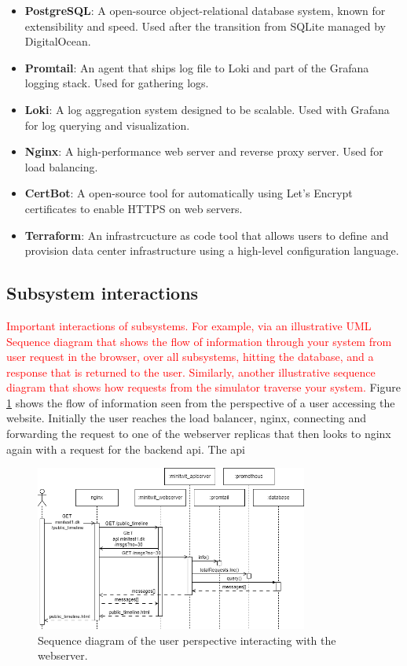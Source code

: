 \begin{multicols}{2}
\begin{itemize}
        \item \textbf{PostgreSQL}: A open-source object-relational database system, known for extensibility and speed. Used after the transition from SQLite managed by DigitalOcean.
        \item \textbf{Promtail}: An agent that ships log file to Loki and part of the Grafana logging stack. Used for gathering logs.
        \item \textbf{Loki}: A log aggregation system designed to be scalable. Used with Grafana for log querying and visualization.
        \item \textbf{Nginx}: A high-performance web server and reverse proxy server. Used for load balancing.
        \item \textbf{CertBot}: A open-source tool for automatically using Let's Encrypt certificates to enable HTTPS on web servers.
        \item \textbf{Terraform}: An infrastrcucture as code tool that allows users to define and provision data center infrastructure using a high-level configuration language. %
    \end{itemize}
\end{multicols}



\subsection{Subsystem interactions}
\textcolor{red}{Important interactions of subsystems.
For example, via an illustrative UML Sequence diagram that shows the flow of information through your system from user request in the browser, over all subsystems, hitting the database, and a response that is returned to the user.
Similarly, another illustrative sequence diagram that shows how requests from the simulator traverse your system.}
Figure \ref{fig:user_sequence} shows the flow of information seen from the perspective of a user accessing the website. Initially the user reaches the load balancer, nginx, connecting and forwarding the request to one of the webserver replicas that then looks to nginx again with a request for the backend api. The api 
\begin{figure}[H]
    \centering
    \includegraphics[width=0.8\textwidth]{images/sequence.png}
    \caption{Sequence diagram of the user perspective interacting with the webserver.}
    \label{fig:user_sequence}
\end{figure}

